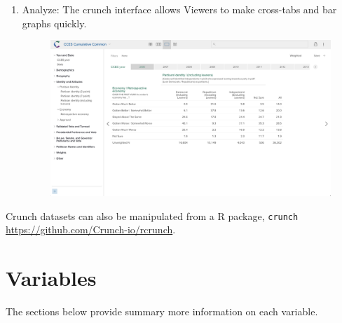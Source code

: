 \documentclass[10pt,article,oneside]{memoir}
\theoremstyle{definition}
\begin{document}
\begin{enumerate}
\def\labelenumi{\arabic{enumi}.}
\setcounter{enumi}{2}
\tightlist
\item
  Analyze: The crunch interface allows Viewers to make cross-tabs and
  bar graphs quickly.\\

  \begin{figure}[H]
  \centering
  \centerline{\includegraphics[width=1.05\linewidth]{02_crunch_tab.png}}
  \end{figure}
\end{enumerate}

Crunch datasets can also be manipulated from a R package,
\texttt{crunch} \url{https://github.com/Crunch-io/rcrunch}.

\newpage

\hypertarget{variables}{%
\section{Variables}\label{variables}}

The sections below provide summary more information on each variable.
\end{document}
